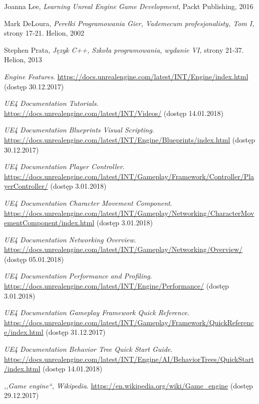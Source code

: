 \documentclass[multip]{SGGW-thesis}
\begin{document}
\begin{thebibliography}{9}

Joanna Lee, \textit{Learning Unreal Engine Game Development}, Packt Publishing, 2016

Mark DeLoura, \textit{Perełki Programowania Gier, Vademecum profesjonalisty, Tom I, }strony 17-21. Helion, 2002

Stephen Prata, \textit{Język C++, Szkoła programowania, wydanie VI,} strony 21-37. Helion, 2013

\textit{Engine Features}. \url{https://docs.unrealengine.com/latest/INT/Engine/index.html} (dostęp 30.12.2017)

\textit{UE4 Documentation Tutorials}. \url{https://docs.unrealengine.com/latest/INT/Videos/} (dostęp 14.01.2018)

\textit{UE4 Documentation Blueprints Visual Scripting}. \url{https://docs.unrealengine.com/latest/INT/Engine/Blueprints/index.html} (dostęp 30.12.2017)

\textit{UE4 Documentation Player Controller}. \url{https://docs.unrealengine.com/latest/INT/Gameplay/Framework/Controller/PlayerController/}  (dostęp 3.01.2018)

\textit{UE4 Documentation Character Movement Component}.  \url{https://docs.unrealengine.com/latest/INT/Gameplay/Networking/CharacterMovementComponent/index.html}  (dostęp 3.01.2018)

\textit{UE4 Documentation Networking Overview}. \url{https://docs.unrealengine.com/latest/INT/Gameplay/Networking/Overview/} (dostęp 05.01.2018)

\textit{UE4 Documentation Performance and Profiling}. \url{https://docs.unrealengine.com/latest/INT/Engine/Performance/}  (dostęp 3.01.2018)

\textit{UE4 Documentation Gameplay Framework Quick Reference}. \url{https://docs.unrealengine.com/latest/INT/Gameplay/Framework/QuickReference/index.html} (dostęp 31.12.2017)

\textit{UE4 Documentation Behavior Tree Quick Start Guide}. \url{https://docs.unrealengine.com/latest/INT/Engine/AI/BehaviorTrees/QuickStart/index.html} (dostęp 14.01.2018)

\textit{,,Game engine``, Wikipedia}. \url{https://en.wikipedia.org/wiki/Game_engine} {\mbox(dostęp 29.12.2017)}


\end{thebibliography}
\end{document}
